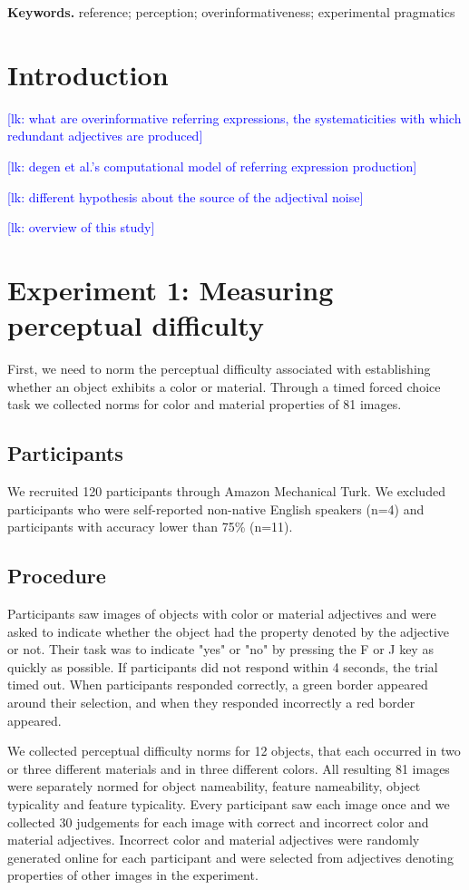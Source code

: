 \documentclass[12pt,letterpaper]{article}
\newcommand{\lk}[1]{\textcolor{Blue}{[lk: #1]}}
\newenvironment{keywords}{%
\vspace{.5em}
\noindent\begin{minipage}{1\textwidth}
\setlength{\leftskip}{0.4in}
\setlength{\rightskip}{0.4in}
\textbf{Keywords.}}
{\end{minipage}}
\begin{document}
\begin{keywords} %
reference; perception; overinformativeness; experimental pragmatics
\end{keywords}

\section{Introduction} %
\lk {what are overinformative referring expressions, the systematicities with which redundant adjectives are produced}

\lk {degen et al.'s computational model of referring expression production}

\lk {different hypothesis about the source of the adjectival noise}

\lk {overview of this study}

\section{Experiment 1: Measuring perceptual difficulty} First, we need to norm the perceptual difficulty associated with establishing whether an object exhibits a color or material. Through a timed forced choice task we collected norms for color and material properties of 81 images.

\subsection{Participants} We recruited 120 participants through Amazon Mechanical Turk. We excluded participants who were self-reported non-native English speakers (n=4) and participants with accuracy lower than 75\% (n=11).

\subsection{Procedure} Participants saw images of objects with color or material adjectives and were asked to indicate whether the object had the property denoted by the adjective or not. Their task was to indicate "yes" or "no" by pressing the F or J key as quickly as possible. If participants did not respond within 4 seconds, the trial timed out. When participants responded correctly, a green border appeared around their selection, and when they responded incorrectly a red border appeared.

We collected perceptual difficulty norms for 12 objects, that each occurred in two or three different materials and in three different colors. All resulting 81 images were separately normed for object nameability, feature nameability, object typicality and feature typicality. Every participant saw each image once and we collected 30 judgements for each image with correct and incorrect color and material adjectives. Incorrect color and material adjectives were randomly generated online for each participant and were selected from adjectives denoting properties of other images in the experiment.
\end{document}

